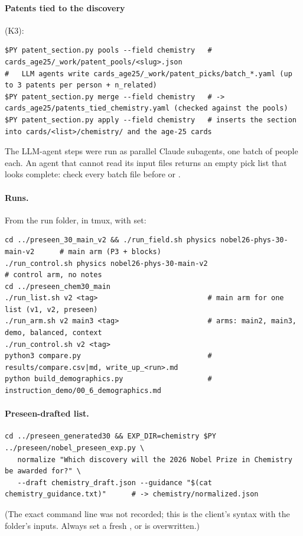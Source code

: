 \documentclass[11pt,a4paper]{article}
\newcommand{\file}[1]{\path{#1}}
\begin{document}
\paragraph{Patents tied to the discovery} (K3):
\begin{Verbatim}
$PY patent_section.py pools --field chemistry   # cards_age25/_work/patent_pools/<slug>.json
#   LLM agents write cards_age25/_work/patent_picks/batch_*.yaml (up to 3 patents per person + n_related)
$PY patent_section.py merge --field chemistry   # -> cards_age25/patents_tied_chemistry.yaml (checked against the pools)
$PY patent_section.py apply --field chemistry   # inserts the section into cards/<list>/chemistry/ and the age-25 cards
\end{Verbatim}
The LLM-agent steps were run as parallel Claude subagents, one batch of people each. An agent that cannot read its
input files returns an empty pick list that looks complete: check every batch file before  or
.

\paragraph{Runs.} From the run folder, in tmux, with  set:
\begin{Verbatim}
cd ../preseen_30_main_v2 && ./run_field.sh physics nobel26-phys-30-main-v2      # main arm (P3 + blocks)
./run_control.sh physics nobel26-phys-30-main-v2                                 # control arm, no notes
cd ../preseen_chem30_main
./run_list.sh v2 <tag>                          # main arm for one list (v1, v2, preseen)
./run_arm.sh v2 main3 <tag>                     # arms: main2, main3, demo, balanced, context
./run_control.sh v2 <tag>
python3 compare.py                              # results/compare.csv|md, write_up_<run>.md
python build_demographics.py                    # instruction_demo/00_6_demographics.md
\end{Verbatim}

\paragraph{Preseen-drafted list.}
\begin{Verbatim}
cd ../preseen_generated30 && EXP_DIR=chemistry $PY ../preseen/nobel_preseen_exp.py \
   normalize "Which discovery will the 2026 Nobel Prize in Chemistry be awarded for?" \
   --draft chemistry_draft.json --guidance "$(cat chemistry_guidance.txt)"      # -> chemistry/normalized.json
\end{Verbatim}
(The exact command line was not recorded; this is the client's syntax with the folder's inputs. Always set a fresh
\code{EXP_DIR}, or \file{preseen_exp/normalized.json} is overwritten.)
\end{document}
